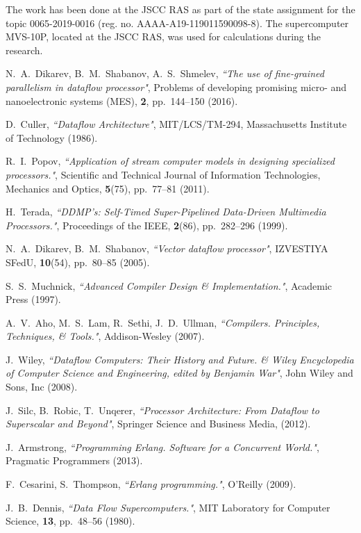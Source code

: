 \documentclass[
11pt,%
tightenlines,%
twoside,%
onecolumn,%
nofloats,%
nobibnotes,%
nofootinbib,%
superscriptaddress,%
noshowpacs,%
centertags]%
{revtex4}
\begin{document}
\begin{acknowledgments}
The work has been done at the JSCC RAS as part of the state assignment for the topic 0065-2019-0016 (reg. no. AAAA-A19-119011590098-8).
The supercomputer MVS-10P, located at the JSCC RAS, was used for calculations during the research.
\end{acknowledgments}

\begin{thebibliography}{99}

N.~A.~Dikarev, B.~M.~Shabanov, A.~S.~Shmelev, {\it ``The use of fine-grained parallelism in dataflow processor"}, Problems of developing promising micro- and nanoelectronic systems (MES), {\bf 2}, pp.~144--150 (2016).

D.~Culler, {\it ``Dataflow Architecture"}, MIT/LCS/TM-294, Massachusetts Institute of Technology (1986).

R.~I.~Popov, {\it ``Application of stream computer models in designing specialized processors."}, Scientific and Technical Journal of Information Technologies, Mechanics and Optics, {\bf 5}(75), pp.~77--81 (2011).

H.~Terada, {\it ``DDMP’s: Self-Timed Super-Pipelined Data-Driven Multimedia Processors."}, Proceedings of the IEEE, {\bf 2}(86), pp.~282--296 (1999).

N.~A.~Dikarev, B.~M.~Shabanov, {\it ``Vector dataflow processor"}, IZVESTIYA SFedU, {\bf 10}(54), pp.~80--85 (2005).

S.~S.~Muchnick, {\it ``Advanced Compiler Design \& Implementation."}, Academic Press (1997).

A.~V.~Aho, M.~S.~Lam, R.~Sethi, J.~D.~Ullman, {\it ``Compilers. Principles, Techniques, \& Tools."}, Addison-Wesley (2007).

J.~Wiley, {\it ``Dataflow Computers: Their History and Future. \& Wiley Encyclopedia of Computer Science and Engineering, edited by Benjamin War"}, John Wiley and Sons, Inc (2008).

J.~Silc, B.~Robic, T.~Unqerer, {\it ``Processor Architecture: From Dataflow to Superscalar and Beyond"}, Springer Science and Business Media, (2012).

J.~Armstrong, {\it ``Programming Erlang. Software for a Concurrent World."}, Pragmatic Programmers (2013).

F.~Cesarini, S.~Thompson, {\it ``Erlang programming."}, O'Reilly (2009).

J.~B.~Dennis, {\it ``Data Flow Supercomputers."}, MIT Laboratory for Computer Science, {\bf 13}, pp.~48--56 (1980).

\end{thebibliography}
\end{document}
